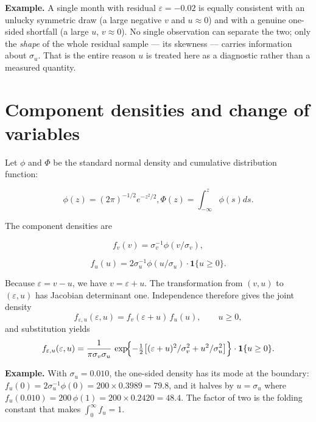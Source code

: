 \textbf{Example.} A single month with residual $\varepsilon=-0.02$ is equally
consistent with an unlucky symmetric draw (a large negative $v$ and
$u\approx0$) and with a genuine one-sided shortfall (a large $u$, $v\approx0$).
No single observation can separate the two; only the \emph{shape} of the
whole residual sample --- its skewness --- carries information about
$\sigma_u$. That is the entire reason $u$ is treated here as a diagnostic
rather than a measured quantity.

\hypertarget{component-densities-and-change-of-variables}{%
\section{Component densities and change of
variables}\label{component-densities-and-change-of-variables}}

Let \ensuremath{\phi } and \ensuremath{\Phi } be the standard normal density and cumulative distribution
function:

\begin{equation}
\phi (z)=(2\pi )^{-1/2}e^{-z^{2}/2}, \Phi (z)=\int _{-\infty}^{z}\phi (s)ds.
\end{equation}

The component densities are

\begin{equation}
f_{v}(v)=\sigma _{v}^{-1}\phi (v/\sigma _{v}),
\end{equation}

\begin{equation}
f_{u}(u)=2\sigma _{u}^{-1}\phi (u/\sigma _{u})\cdot \mathbf{1}\{u\geq 0\}.
\end{equation}

Because $\varepsilon=v-u$, we have $v=\varepsilon+u$. The transformation from
$(v,u)$ to $(\varepsilon,u)$ has Jacobian determinant one. Independence
therefore gives the joint density
\begin{equation}
f_{\varepsilon ,u}(\varepsilon ,u)=f_{v}(\varepsilon +u)\,f_{u}(u), \qquad u\geq 0,
\end{equation}
and substitution yields
\begin{equation}
f_{\varepsilon ,u}(\varepsilon ,u)= \frac{1}{\pi \sigma _{v}\sigma _{u}}\,
\exp\!\Bigl\{-\tfrac{1}{2}\bigl[(\varepsilon +u)^{2}/\sigma _{v}^{2}+u^{2}/\sigma _{u}^{2}\bigr]\Bigr\}\cdot \mathbf{1}\{u\geq 0\}.
\end{equation}

\textbf{Example.} With $\sigma_u=0.010$, the one-sided density has its mode at
the boundary: $f_u(0)=2\sigma_u^{-1}\phi(0)=200\times0.3989=79.8$, and it
halves by $u=\sigma_u$ where $f_u(0.010)=200\,\phi(1)=200\times0.2420=48.4$.
The factor of two is the folding constant that makes $\int_0^\infty f_u=1$.

